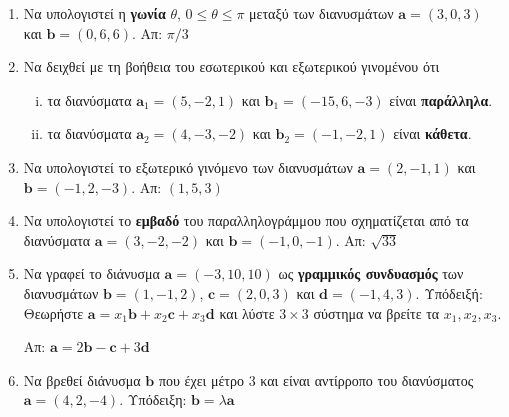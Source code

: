\documentclass[a4paper,table]{report}
\renewcommand{\vec}{\mathbf}
\begin{document}
\begin{center}
  \minibox{\large \bfseries \textcolor{Col1}{Ασκήσεις στα Διανύσματα}}
\end{center}

\vspace{\baselineskip}

\begin{enumerate}[itemsep=0.7\baselineskip]

  \item Να υπολογιστεί η \textbf{γωνία} $ \theta $, $ 0\leq \theta \leq \pi $ μεταξύ των 
    διανυσμάτων $ \vec{a} = (3,0,3) $ και $ \vec{b} = (0,6,6) $.
    \hfill Απ: $ \pi/{3} $

  \item Να δειχθεί με τη βοήθεια του εσωτερικού και εξωτερικού γινομένου ότι
    \begin{enumerate}[i)]
      \item τα διανύσματα $ \vec{a}_1 = (5,-2,1) $ και $ \vec{b}_1 = (-15,6,-3) $ είναι 
        \textbf{παράλληλα}.
      \item τα διανύσματα $ \vec{a}_2 = (4,-3,-2) $ και $ \vec{b}_2 = (-1,-2,1) $ είναι 
        \textbf{κάθετα}.
    \end{enumerate}

  \item Να υπολογιστεί το εξωτερικό γινόμενο των διανυσμάτων 
    $ \vec{a} = (2,-1,1) $ και $ \vec{b} = (-1,2,-3) $.
    \hfill Απ: $ (1,5,3) $

  \item Να υπολογιστεί το \textbf{εμβαδό} του παραλληλογράμμου που σχηματίζεται από τα 
    διανύσματα $ \vec{a} = (3,-2,-2) $ και $ \vec{b} = (-1,0,-1) $.
    \hfill Απ: $ \sqrt{33} $ 

  \item Να γραφεί το διάνυσμα $ \vec{a}=(-3,10,10) $ ως \textbf{γραμμικός συνδυασμός} 
    των διανυσμάτων $\vec{b}=(1,-1,2)$, $ \vec{c}=(2,0,3) $ και $ \vec{d}=(-1,4,3) $.  
    \hfill \textcolor{Col1}{Υπόδειξή:} Θεωρήστε 
    $ \mathbf{a} = x_{1} \mathbf{b} + x_{2} \mathbf{c} + x_{3} \mathbf{d}$ και λύστε 
    $ 3\times 3 $ σύστημα να βρείτε τα $ x_{1}, x_{2}, x_{3} $. 

    \hfill Απ: $ \vec{a}=2\vec{b}-\vec{c}+3\vec{d} $

  \item Να βρεθεί διάνυσμα $ \vec{b} $ που έχει μέτρο $3$ και είναι αντίρροπο του 
    διανύσματος $ \vec{a}=(4,2,-4)$.
    \hfill \textcolor{Col1}{Υπόδειξη:} $ \vec{b} = \lambda \vec{a} $		


\end{enumerate}
\end{document}
